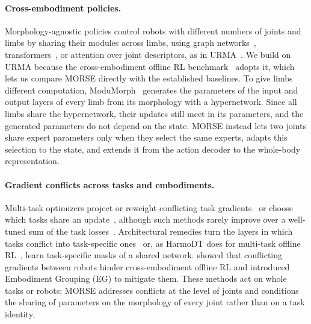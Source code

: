 \paragraph{Cross-embodiment policies.}
Morphology-agnostic policies control robots with different numbers of joints and limbs by sharing their modules across
limbs, using graph networks~\citep{wang2018nervenet,huang2020smp},
transformers~\citep{kurin2021amorpheus,gupta2022metamorph}, or attention over joint descriptors, as in
URMA~\citep{bohlinger2024onepolicy}. We build on URMA because the cross-embodiment offline RL
benchmark~\citep{abe2026crossembodimentoffline} adopts it, which lets us compare MORSE directly with the established
baselines. To give limbs different computation, ModuMorph~\citep{xiong2023modumorph} generates
the parameters of the input and output layers of every limb from its morphology with a hypernetwork. Since all limbs
share the hypernetwork, their updates still meet in its parameters, and the generated parameters do not depend on the
state. MORSE instead lets two joints share expert parameters only when they select the same experts, adapts this
selection to the state, and extends it from the action decoder to the whole-body representation.

\paragraph{Gradient conflicts across tasks and embodiments.}
Multi-task optimizers project or reweight conflicting task
gradients~\citep{yu2020pcgrad,liu2021cagrad,navon2022nashmtl} or choose which tasks share an
update~\citep{standley2020which,fifty2021tag,jeong2025sel}, although such methods rarely improve over a well-tuned sum
of the task losses~\citep{xin2022mto,kurin2022unitary}. Architectural remedies turn the layers in which tasks conflict
into task-specific ones~\citep{shi2023recon} or, as HarmoDT does for multi-task offline RL~\citep{hu2024harmodt}, learn
task-specific masks of a shared network.
\citet{abe2026crossembodimentoffline} showed that conflicting gradients between robots hinder cross-embodiment offline RL
and introduced Embodiment Grouping (EG) to mitigate them. These methods act on whole tasks or robots; MORSE addresses
conflicts at the level of joints and conditions the sharing of parameters on the morphology of every joint rather than
on a task identity.

